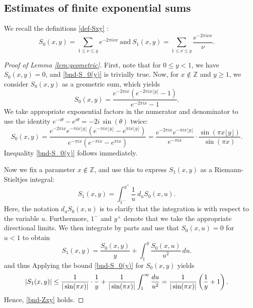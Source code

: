 \documentclass[11pt,letterpaper,oneside,reqno]{amsart}
\renewcommand{\^}[1]{\widehat{#1}}
\newcommand{\Z}{{\mathbb{Z}}}
\numberwithin{equation}{section}
\theoremstyle{remark}
\begin{document}
\subsection{Estimates of finite exponential sums}
%
We recall the definitions \eqref{def-Sxy} :
    \begin{equation}
        S_0(x,y) = \sum_{1\leq \nu\leq y} {e^{-2\pi i \nu x}}\ \text{and}\ 
        S_1(x,y) = \sum_{1\leq \nu\leq y} \frac{e^{-2\pi i \nu x}}{\nu}.
\end{equation}
%
\begin{proof}[Proof of Lemma \ref{lem:geometric}]
    First, note that for $0\leq y<1$, we have $S_0(x,y)=0$, and \eqref{bnd-S_0(y)} is trivially true. Now, for $x\notin \Z$ and $y \geq 1$, we consider $S_0(x,y)$ as a geometric sum, which yields
        \begin{equation*}
            S_0(x,y) = \frac{e^{-2\pi i x}\left( e^{-2\pi i x \lfloor y\rfloor} -1 \right)}
            {e^{-2\pi i x}-1}.
        \end{equation*}
        We take appropriate exponential factors in the numerator and denominator to use the identity $e^{-i\theta}-e^{i\theta}= -2i\,\sin(\theta)$ twice:
        \[
        S_0(x,y) 
        = \frac{e^{-2\pi i x}e^{-\pi i x\lfloor y \rfloor}\left( e^{-\pi i x \lfloor y\rfloor} - e^{\pi i x \lfloor y\rfloor} \right)}
            {e^{-\pi i x}(e^{-\pi i x}-e^{\pi i x})} 
        = \frac{e^{-2\pi i x}e^{-\pi i x\lfloor y \rfloor}}
            {e^{-\pi i x}} \cdot \frac{\sin (\pi x\lfloor y \rfloor)}{\sin(\pi x)}.
        \]
        Inequality \eqref{bnd-S_0(y)} follows immediately.
        \smallskip

        Now we fix a parameter $x\notin \Z$, and use this to express $S_1(x,y)$ as a Riemann-Stieltjes integral: %
        \[
            S_1(x,y) = \int_{1^-}^{y^+} \frac{1}{u} \ d_u S_0(x,u).
        \]
        Here, the notation $d_u S_0(x,u)$ is to clarify that 
        the integration is with respect to the variable $u$. Furthermore, $1^-$ and $y^+$ denote that we take the appropriate directional limits. 
        We then integrate by parts and use that $S_0(x,u)=0$ for $u<1$ to obtain
        \begin{equation*}
            S_1(x,y) = \frac{S_0(x,y)}{y} + \int_1^y \frac{S_0(x,u)}{u^2} \, du.
        \end{equation*}
        and thus
        Applying the bound \eqref{bnd-S_0(y)} for $S_0(x,y)$ yields
        \[
            |S_1(x,y)| \leq \frac{1}{|\sin(\pi x)|}\cdot\frac{1}{y} + 
            \frac{1}{|\sin(\pi x)|}\int_1^\infty \frac{du}{u^2}\\
            =  \frac{1}{|\sin(\pi x)|}\left( \frac{1}{y} +1
            \right).
        \]
        Hence, \eqref{bnd-Zxy} holds.
        \smallskip


\end{proof}
\end{document}
